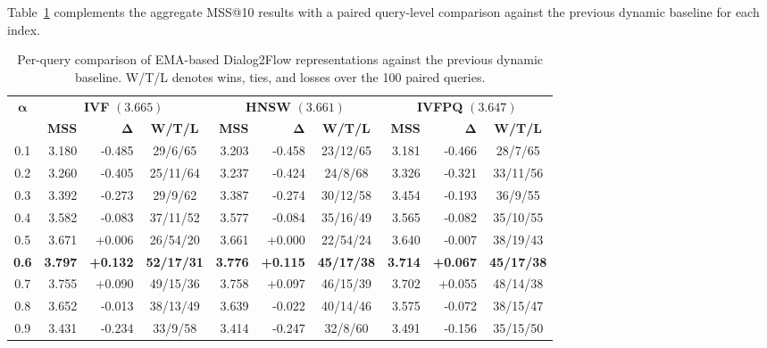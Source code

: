 \documentclass[runningheads]{llncs}
\begin{document}
Table~\ref{tab:ema_vs_dynamic_per_query} complements the aggregate MSS@10 results with a paired query-level comparison against the previous dynamic baseline for each index.

\begin{table}[ht]
\centering
\scriptsize
\setlength{\tabcolsep}{3.5pt}
\renewcommand{\arraystretch}{1.12}
\caption{Per-query comparison of EMA-based Dialog2Flow representations against the previous dynamic baseline. W/T/L denotes wins, ties, and losses over the 100 paired queries.}
\label{tab:ema_vs_dynamic_per_query}
\begin{adjustbox}{max width=\textwidth}
\begin{tabular}{c rrc rrc rrc}
\toprule
\multirow{2}{*}{$\boldsymbol{\alpha}$} &
\multicolumn{3}{c}{\textbf{IVF} $(3.665)$} &
\multicolumn{3}{c}{\textbf{HNSW} $(3.661)$} &
\multicolumn{3}{c}{\textbf{IVFPQ} $(3.647)$} \\
\cmidrule(lr){2-4}
\cmidrule(lr){5-7}
\cmidrule(lr){8-10}
& \textbf{MSS} & $\boldsymbol{\Delta}$ & \textbf{W/T/L}
& \textbf{MSS} & $\boldsymbol{\Delta}$ & \textbf{W/T/L}
& \textbf{MSS} & $\boldsymbol{\Delta}$ & \textbf{W/T/L} \\
\midrule
0.1 & 3.180 & -0.485 & 29/6/65  & 3.203 & -0.458 & 23/12/65 & 3.181 & -0.466 & 28/7/65  \\
0.2 & 3.260 & -0.405 & 25/11/64 & 3.237 & -0.424 & 24/8/68  & 3.326 & -0.321 & 33/11/56 \\
0.3 & 3.392 & -0.273 & 29/9/62  & 3.387 & -0.274 & 30/12/58 & 3.454 & -0.193 & 36/9/55  \\
0.4 & 3.582 & -0.083 & 37/11/52 & 3.577 & -0.084 & 35/16/49 & 3.565 & -0.082 & 35/10/55 \\
0.5 & 3.671 & +0.006 & 26/54/20 & 3.661 & +0.000 & 22/54/24 & 3.640 & -0.007 & 38/19/43 \\
\textbf{0.6}
    & \textbf{3.797} & \textbf{+0.132} & \textbf{52/17/31}
    & \textbf{3.776} & \textbf{+0.115} & \textbf{45/17/38}
    & \textbf{3.714} & \textbf{+0.067} & \textbf{45/17/38} \\
0.7 & 3.755 & +0.090 & 49/15/36 & 3.758 & +0.097 & 46/15/39 & 3.702 & +0.055 & 48/14/38 \\
0.8 & 3.652 & -0.013 & 38/13/49 & 3.639 & -0.022 & 40/14/46 & 3.575 & -0.072 & 38/15/47 \\
0.9 & 3.431 & -0.234 & 33/9/58  & 3.414 & -0.247 & 32/8/60  & 3.491 & -0.156 & 35/15/50 \\
\bottomrule
\end{tabular}
\end{adjustbox}
\end{table}
\end{document}
